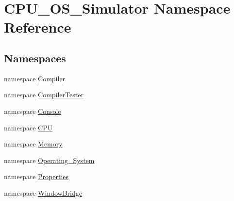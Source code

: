\hypertarget{namespace_c_p_u___o_s___simulator}{}\section{C\+P\+U\+\_\+\+O\+S\+\_\+\+Simulator Namespace Reference}
\label{namespace_c_p_u___o_s___simulator}
\subsection*{Namespaces}
\begin{DoxyCompactItemize}
\item 
namespace \hyperlink{namespace_c_p_u___o_s___simulator_1_1_compiler}{Compiler}
\item 
namespace \hyperlink{namespace_c_p_u___o_s___simulator_1_1_compiler_tester}{Compiler\+Tester}
\item 
namespace \hyperlink{namespace_c_p_u___o_s___simulator_1_1_console}{Console}
\item 
namespace \hyperlink{namespace_c_p_u___o_s___simulator_1_1_c_p_u}{C\+P\+U}
\item 
namespace \hyperlink{namespace_c_p_u___o_s___simulator_1_1_memory}{Memory}
\item 
namespace \hyperlink{namespace_c_p_u___o_s___simulator_1_1_operating___system}{Operating\+\_\+\+System}
\item 
namespace \hyperlink{namespace_c_p_u___o_s___simulator_1_1_properties}{Properties}
\item 
namespace \hyperlink{namespace_c_p_u___o_s___simulator_1_1_window_bridge}{Window\+Bridge}
\end{DoxyCompactItemize}
